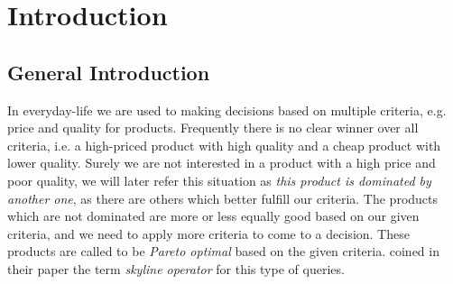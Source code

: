 
\newcommand\nospellcheck[1]{#1}%
\newcommand\naive{\nospellcheck{na\"{\i}ve}\xspace}%
\newcommand\Naive{\nospellcheck{Na\"{\i}ve}\xspace}%





\chapter{Introduction}
\label{chap:introduction}

\section{General Introduction}
\label{sec:generalintroduction}

In everyday-life we are used to making decisions based on multiple
criteria, e.g. price and quality for products.  Frequently there is no
clear winner over all criteria, i.e. a high-priced product with high
quality and a cheap product with lower quality.  Surely we are not
interested in a product with a high price and poor quality, we will
later refer this situation as \emph{this product is dominated by
another one}, as there are others which better fulfill our criteria.  The
products which are not dominated are more or less equally good based on
our given criteria, and we need to apply more criteria to come to a
decision.  These products are called to be \emph{Pareto optimal}
based on the given criteria. \citet{Borzsonyi2001} coined in their
paper the term \emph{skyline operator} for this type of queries.

